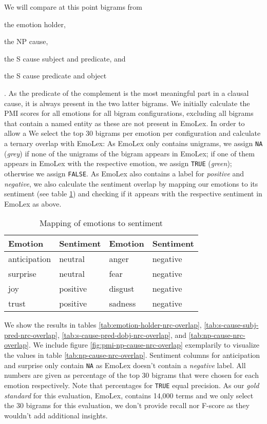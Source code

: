 \begin{inparaenum} We will compare at this point bigrams from \item the emotion holder, \item the NP cause, \item the S cause subject and predicate, and \item the S cause predicate and object \end{inparaenum}. As the predicate of the complement is the most meaningful part in a clausal cause, it is always present in the two latter bigrams. We initially calculate the PMI scores for all emotions for all bigram configurations, excluding all bigrams that contain a named entity as these are not present in EmoLex. In order to allow a We select the top 30 bigrams per emotion per configuration and calculate a ternary overlap with EmoLex: As EmoLex only contains unigrams, we assign \texttt{NA} (\textit{grey}) if none of the unigrams of the bigram appears in EmoLex; if one of them appears in EmoLex with the respective emotion, we assign \texttt{TRUE} (\textit{green}); otherwise we assign \texttt{FALSE}. As EmoLex also contains a label for \textit{positive} and \textit{negative}, we also calculate the sentiment overlap by mapping our emotions to its sentiment (see table \ref{tab:emotion2sentiment}) and checking if it appears with the respective sentiment in EmoLex as above. 

\begin{table}[]
\centering
\begin{tabular}{l|l||l|l}
{\bf Emotion} & {\bf Sentiment} & {\bf Emotion} & {\bf Sentiment} \\\hline
anticipation  & neutral         & anger         & negative        \\
surprise      & neutral         & fear          & negative        \\
joy           & positive        & disgust       & negative        \\
trust         & positive        & sadness       & negative       
\end{tabular}
\caption{Mapping of emotions to sentiment}
\label{tab:emotion2sentiment}
\end{table}

We show the results in tables \ref{tab:emotion-holder-nrc-overlap}, \ref{tab:s-cause-subj-pred-nrc-overlap}, \ref{tab:s-cause-pred-dobj-nrc-overlap}, and \ref{tab:np-cause-nrc-overlap}. We include figure \ref{fig:pmi-np-cause-nrc-overlap} exemplarily to visualize the values in table \ref{tab:np-cause-nrc-overlap}. Sentiment columns for anticipation and surprise only contain \texttt{NA} as EmoLex doesn't contain a \textit{negative} label. All numbers are given as percentage of the top 30 bigrams that were chosen for each emotion respectively. Note that percentages for \texttt{TRUE} equal precision. As our \textit{gold standard} for this evaluation, EmoLex, contains 14,000 terms and we only select the 30 bigrams for this evaluation, we don't provide recall nor F-score as they wouldn't add additional insights.

